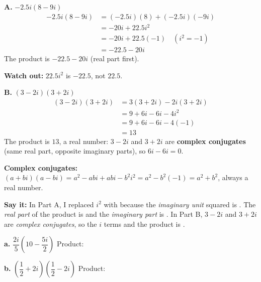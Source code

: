 \begin{minipage}[t]{0.48\textwidth}
\textbf{A.} $-2.5i(8-9i)$
\begin{align*}
-2.5i(8-9i) &= (-2.5i)(8)+(-2.5i)(-9i)\\
&= -20i+22.5i^2\\
&= -20i+22.5(-1) \quad (i^2=-1)\\
&= -22.5-20i
\end{align*}
The product is $-22.5-20i$ (real part first).

\small\textbf{Watch out:} $22.5i^2$ is $-22.5$, not $22.5$.
\end{minipage}\hfill
\begin{minipage}[t]{0.48\textwidth}
\textbf{B.} $(3-2i)(3+2i)$
\begin{align*}
(3-2i)(3+2i) &= 3(3+2i)-2i(3+2i)\\
&= 9+6i-6i-4i^2\\
&= 9+6i-6i-4(-1)\\
&= 13
\end{align*}
The product is $13$, a real number: $3-2i$ and $3+2i$ are \textbf{complex conjugates} (same real part, opposite imaginary parts), so $6i-6i=0$.
\end{minipage}

\textbf{Complex conjugates:} $(a+bi)(a-bi)=a^2-abi+abi-b^2i^2=a^2-b^2(-1)=a^2+b^2$, always a real number.

\textbf{Say it:} In Part A, I replaced $i^2$ with \blank[1.5cm] because the \emph{imaginary unit} squared is \blank[1.5cm]. The \emph{real part} of the product is \blank[1.8cm] and the \emph{imaginary part} is \blank[1.8cm]. In Part B, $3-2i$ and $3+2i$ are \emph{complex conjugates}, so the $i$ terms \blank[2.5cm] and the product is \blank[3cm].
\lines[1]

\newpage
{}
\begin{minipage}[t]{0.48\textwidth}
\textbf{a.} $\dfrac{2i}{5}\left(10-\dfrac{5i}{2}\right)$
\lines[6]
\vspace{4pt}
Product: \blank[4cm]
\end{minipage}\hfill
\begin{minipage}[t]{0.48\textwidth}
\textbf{b.} $\left(\dfrac12+2i\right)\left(\dfrac12-2i\right)$
\lines[6]
\vspace{4pt}
Product: \blank[4cm]
\end{minipage}

